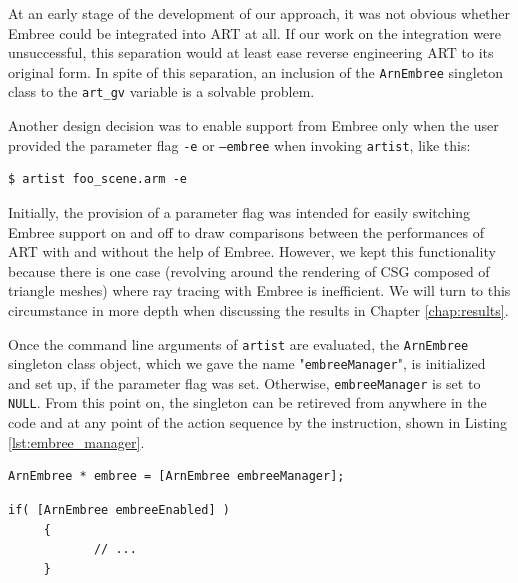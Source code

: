 At an early stage of the development of our approach, it was not obvious whether Embree could be integrated into ART at all. If our work on the integration were unsuccessful, this separation would at least ease reverse engineering ART to its original form.
In spite of this separation, an inclusion of the \texttt{ArnEmbree} singleton class to the \texttt{art\_gv} variable is a solvable problem.

Another design decision was to enable support from Embree only when the user provided the parameter flag \texttt{-e} or \texttt{--embree} when invoking \texttt{artist}, like this:

\begin{Verbatim}
$ artist foo_scene.arm -e
\end{Verbatim}

Initially, the provision of a parameter flag was intended for easily switching Embree support on and off to draw comparisons between the performances of ART with and without the help of Embree. However, we kept this functionality because there is one case (revolving around the rendering of CSG composed of triangle meshes) where ray tracing with Embree is inefficient. We will turn to this circumstance in more depth when discussing the results in Chapter \ref{chap:results}. 

Once the command line arguments of \texttt{artist} are evaluated, the \texttt{ArnEmbree} singleton class object, which we gave the name "\texttt{embreeManager}", is initialized and set up, if the parameter flag was set. Otherwise, \texttt{embreeManager} is set to \texttt{NULL}. From this point on, the  singleton can be retireved from anywhere in the code and at any point of the action sequence by the instruction, shown in Listing \ref{lst:embree_manager}.

\begin{listing} 
	\begin{lstlisting}[caption={Retrieval the \texttt{ArnEmbree} singleton object.}, label={lst:embree_manager}]
	ArnEmbree * embree = [ArnEmbree embreeManager];
	\end{lstlisting}
\end{listing}


\begin{listing}
	\begin{lstlisting}[caption={Verifying if Embree support was enables by the user.}, label={lst:check_embree}]
	 if( [ArnEmbree embreeEnabled] ) 
	 {
	 		// ...
	 }
	\end{lstlisting}
\end{listing}

